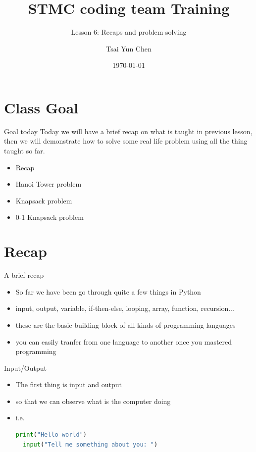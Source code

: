 \documentclass[10pt,xcolor={table,dvipsnames},t]{beamer}
\title[Your Short Title]{STMC coding team Training}
\subtitle{Lesson 6: Recaps and problem solving}
\author{Tsai Yun Chen}
\date{\today}
\begin{document}
\begin{frame}
  \titlepage
\end{frame}


\section{Class Goal}

\begin{frame}{Goal today}
Today we will have a brief recap on what is taught in previous lesson, then we will demonstrate how to solve some real life problem using all the thing taught so far.
\begin{itemize}
  \item Recap
  \item Hanoi Tower problem
  \item Knapsack problem
  \item 0-1 Knapsack problem
\end{itemize}
\end{frame}


\section{Recap}
\begin{frame}[fragile]{A brief recap}
  \begin{itemize}
    \item So far we have been go through quite a few things in Python
    \item input, output, variable, if-then-else, looping, array, function, recursion...
    \item these are the basic building block of all kinds of programming languages
    \item you can easily tranfer from one language to another once you mastered programming
  \end{itemize}
\end{frame}

\begin{frame}[fragile]{Input/Output}
  \begin{itemize}
    \item The first thing is input and output
    \item so that we can observe what is the computer doing
    \item i.e.
\begin{lstlisting}[language=python]
  print("Hello world")
  input("Tell me something about you: ")
\end{lstlisting}
  \end{itemize}
\end{frame}
\end{document}
